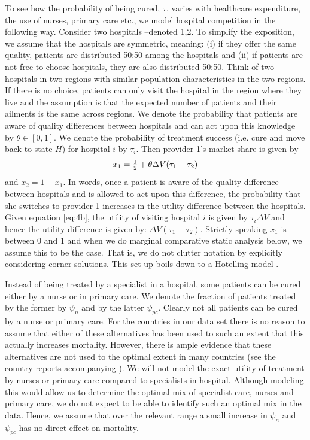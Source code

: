 \documentclass[a4paper,12pt]{article}
\begin{document}
To see how the probability of being cured, \(\tau\), varies with healthcare expenditure, the use of nurses, primary care etc., we model hospital competition in the following way. Consider two hospitals --denoted 1,2. To simplify the exposition, we assume that the hospitals are symmetric, meaning: (i) if they offer the same quality, patients are distributed 50:50 among the hospitals and (ii) if patients are not free to choose hospitals, they are also distributed 50:50. Think of two hospitals in two regions with similar population characteristics in the two regions. If there is no choice, patients can only visit the hospital in the region where they live and the assumption is that the expected number of patients and their ailments is the same across regions. We denote the probability that patients are aware of quality differences between hospitals and can act upon this knowledge by \(\theta \in [0,1]\). We denote the probability of treatment success (i.e. cure and move back to state \(H\)) for hospital \(i\)  by \(\tau_i\). Then provider 1's market share is given by
\begin{equation}
\label{eq:8}
x_1 = \textstyle{1\over 2}  + \theta \Delta V (\tau_1 - \tau_2)
\end{equation}
and \(x_2 = 1- x_1\). In words, once a patient is aware of the quality difference between hospitals and is allowed to act upon this difference, the probability that she switches to provider 1 increases in the utility difference between the hospitals. Given equation \eqref{eq:4b}, the utility of visiting hospital \(i\) is given by \(\tau_i \Delta V\) and hence the utility difference is given by: \(\Delta V (\tau_1-\tau_2)\). Strictly speaking \(x_1\) is between 0 and 1 and when we do marginal comparative static analysis below, we assume this to be the case. That is, we do not clutter notation by explicitly considering corner solutions. This set-up boils down to a Hotelling model \citep{Tirole}.

Instead of being treated by a specialist in a hospital, some patients can be cured either by a nurse or in primary care. We denote the fraction of patients treated by the former by \(\psi_n\) and by the latter \(\psi_{pc}\). Clearly not all patients can be cured by a nurse or primary care. For the countries in our data set there is no reason to assume that either of these alternatives has been used to such an extent that this actually increases mortality. However, there is ample evidence that these alternatives are not used to the optimal extent in many countries (see the country reports accompanying \cite{countryprofileReport}). We will not model the exact utility of treatment by nurses or primary care compared to specialists in hospital. Although modeling this would allow us to determine the optimal mix of specialist care, nurses and primary care, we do not expect to be able to identify such an optimal mix in the data. Hence, we assume that over the relevant range a small increase in \(\psi_n\) and \(\psi_{pc}\) has no direct effect on mortality.
\end{document}
